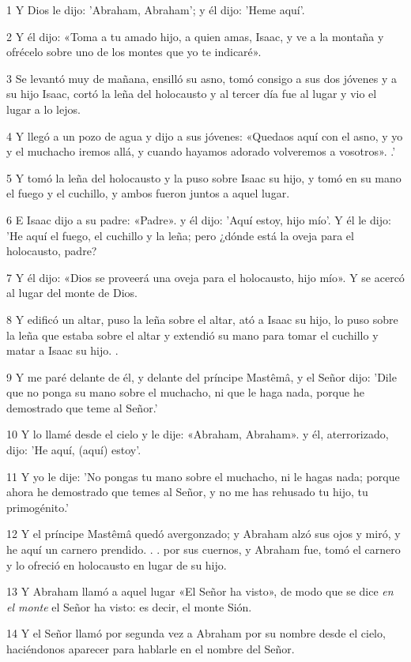 \par 1 Y Dios le dijo: 'Abraham, Abraham'; y él dijo: 'Heme aquí'.
\par 2 Y él dijo: «Toma a tu amado hijo, a quien amas, Isaac, y ve a la montaña y ofrécelo sobre uno de los montes que yo te indicaré».
\par 3 Se levantó muy de mañana, ensilló su asno, tomó consigo a sus dos jóvenes y a su hijo Isaac, cortó la leña del holocausto y al tercer día fue al lugar y vio el lugar a lo lejos.
\par 4 Y llegó a un pozo de agua y dijo a sus jóvenes: «Quedaos aquí con el asno, y yo y el muchacho iremos allá, y cuando hayamos adorado volveremos a vosotros». .'
\par 5 Y tomó la leña del holocausto y la puso sobre Isaac su hijo, y tomó en su mano el fuego y el cuchillo, y ambos fueron juntos a aquel lugar.
\par 6 E Isaac dijo a su padre: «Padre». y él dijo: 'Aquí estoy, hijo mío'. Y él le dijo: 'He aquí el fuego, el cuchillo y la leña; pero ¿dónde está la oveja para el holocausto, padre?
\par 7 Y él dijo: «Dios se proveerá una oveja para el holocausto, hijo mío». Y se acercó al lugar del monte de Dios.
\par 8 Y edificó un altar, puso la leña sobre el altar, ató a Isaac su hijo, lo puso sobre la leña que estaba sobre el altar y extendió su mano para tomar el cuchillo y matar a Isaac su hijo. .
\par 9 Y me paré delante de él, y delante del príncipe Mastêmâ, y el Señor dijo: 'Dile que no ponga su mano sobre el muchacho, ni que le haga nada, porque he demostrado que teme al Señor.'
\par 10 Y lo llamé desde el cielo y le dije: «Abraham, Abraham». y él, aterrorizado, dijo: 'He aquí, (aquí) estoy'.
\par 11 Y yo le dije: 'No pongas tu mano sobre el muchacho, ni le hagas nada; porque ahora he demostrado que temes al Señor, y no me has rehusado tu hijo, tu primogénito.'
\par 12 Y el príncipe Mastêmâ quedó avergonzado; y Abraham alzó sus ojos y miró, y he aquí un carnero prendido. . . por sus cuernos, y Abraham fue, tomó el carnero y lo ofreció en holocausto en lugar de su hijo.
\par 13 Y Abraham llamó a aquel lugar «El Señor ha visto», de modo que se dice \textit{en el monte} el Señor ha visto: es decir, el monte Sión.
\par 14 Y el Señor llamó por segunda vez a Abraham por su nombre desde el cielo, haciéndonos aparecer para hablarle en el nombre del Señor.
